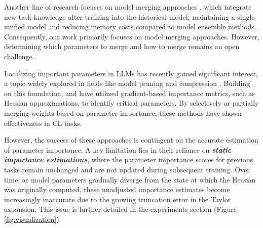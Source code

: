 Another line of research focuses on model merging approaches \cite{dou-etal-2024-loramoe, wan2024knowledge, yadav2024survey}, which integrate new task knowledge after training into the historical model, maintaining a single unified model and reducing memory costs compared to model ensemble methods.
Consequently, our work primarily focuses on model merging approaches.
However, determining which parameters to merge and how to merge remains an open challenge \cite{qin2024large}.

Localizing important parameters in LLMs has recently gained significant interest, a topic widely explored in fields like model pruning and compression \cite{lu2021engage, panigrahi2023task, sun2023simple, yadav2024ties}. Building on this foundation, \citet{feng2024tasl} and \citet{du2024unlocking} have utilized gradient-based importance metrics, such as Hessian approximations, to identify critical parameters. By selectively or partially merging weights based on parameter importance, these methods have shown effectiveness in CL tasks.

However, the success of these approaches is contingent on the accurate estimation of parameter importance. A key limitation lies in their reliance on \textit{\textbf{static importance estimations}}, where the parameter importance scores for previous tasks remain unchanged and are not updated during subsequent training.
Over time, as model parameters gradually diverge from the state at which the Hessian was originally computed, these unadjusted importance estimates become increasingly inaccurate due to the growing truncation error in the Taylor expansion.
This issue is further detailed in the experiments section (Figure \ref{fig:visualization}).

